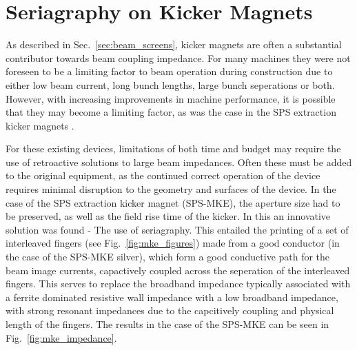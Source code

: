 \section{Seriagraphy on Kicker Magnets}
\label{sec:seriagraphy}

As described in Sec.~\ref{sec:beam_screens}, kicker magnets are often a substantial contributor towards beam coupling impedance. For many machines they were not foreseen to be a limiting factor to beam operation during construction due to either low beam current, long bunch lengths, large bunch seperations or both. However, with increasing improvements in machine performance, it is possible that they may become a limiting factor, as was the case in the SPS extraction kicker magnets \cite{Kroyer:MKEReduct}. 

For these existing devices, limitations of both time and budget may require the use of retroactive solutions to large beam impedances. Often these must be added to the original equipment, as the continued correct operation of the device requires minimal disruption to the geometry and surfaces of the device. In the case of the SPS extraction kicker magnet (SPS-MKE), the aperture size had to be preserved, as well as the field rise time of the kicker. In this an innovative solution was found - The use of seriagraphy. This entailed the printing of a set of interleaved fingers (see Fig.~\ref{fig:mke_figures}) made from a good conductor (in the case of the SPS-MKE silver), which form a good conductive path for the beam image currents, capactively coupled across the seperation of the interleaved fingers. This serves to replace the broadband impedance typically associated with a ferrite dominated resistive wall impedance with a low broadband impedance, with strong resonant impedances due to the capcitively coupling and physical length of the fingers. The results in the case of the SPS-MKE can be seen in Fig.~\ref{fig:mke_impedance}.


